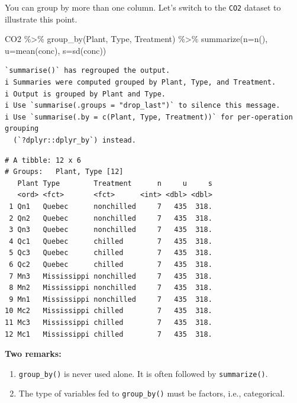 \documentclass[
  letterpaper,
  DIV=11,
  numbers=noendperiod]{scrreprt}
\newenvironment{Shaded}{\begin{snugshade}}{\end{snugshade}}
\newcommand{\AttributeTok}[1]{\textcolor[rgb]{0.40,0.45,0.13}{#1}}
\newcommand{\FunctionTok}[1]{\textcolor[rgb]{0.28,0.35,0.67}{#1}}
\newcommand{\NormalTok}[1]{\textcolor[rgb]{0.00,0.23,0.31}{#1}}
\newcommand{\SpecialCharTok}[1]{\textcolor[rgb]{0.37,0.37,0.37}{#1}}
\begin{document}
You can group by more than one column. Let's switch to the \texttt{CO2}
dataset to illustrate this point.

\begin{Shaded}
\begin{Highlighting}[]
\NormalTok{CO2 }\SpecialCharTok{\%\textgreater{}\%}
  \FunctionTok{group\_by}\NormalTok{(Plant, Type, Treatment) }\SpecialCharTok{\%\textgreater{}\%}
  \FunctionTok{summarize}\NormalTok{(}\AttributeTok{n=}\FunctionTok{n}\NormalTok{(),}
            \AttributeTok{u=}\FunctionTok{mean}\NormalTok{(conc),}
            \AttributeTok{s=}\FunctionTok{sd}\NormalTok{(conc))}
\end{Highlighting}
\end{Shaded}

\begin{verbatim}
`summarise()` has regrouped the output.
i Summaries were computed grouped by Plant, Type, and Treatment.
i Output is grouped by Plant and Type.
i Use `summarise(.groups = "drop_last")` to silence this message.
i Use `summarise(.by = c(Plant, Type, Treatment))` for per-operation grouping
  (`?dplyr::dplyr_by`) instead.
\end{verbatim}

\begin{verbatim}
# A tibble: 12 x 6
# Groups:   Plant, Type [12]
   Plant Type        Treatment      n     u     s
   <ord> <fct>       <fct>      <int> <dbl> <dbl>
 1 Qn1   Quebec      nonchilled     7   435  318.
 2 Qn2   Quebec      nonchilled     7   435  318.
 3 Qn3   Quebec      nonchilled     7   435  318.
 4 Qc1   Quebec      chilled        7   435  318.
 5 Qc3   Quebec      chilled        7   435  318.
 6 Qc2   Quebec      chilled        7   435  318.
 7 Mn3   Mississippi nonchilled     7   435  318.
 8 Mn2   Mississippi nonchilled     7   435  318.
 9 Mn1   Mississippi nonchilled     7   435  318.
10 Mc2   Mississippi chilled        7   435  318.
11 Mc3   Mississippi chilled        7   435  318.
12 Mc1   Mississippi chilled        7   435  318.
\end{verbatim}

\textbf{Two remarks:}

\begin{enumerate}
\def\labelenumi{\arabic{enumi}.}
\item
  \texttt{group\_by()} is never used alone. It is often followed by
  \texttt{summarize()}.
\item
  The type of variables fed to \texttt{group\_by()} must be factors,
  i.e., categorical.
\end{enumerate}
\end{document}
